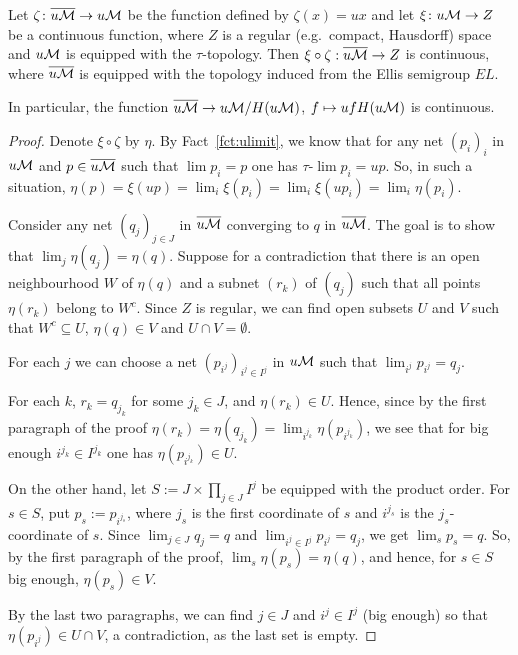	\begin{prop}
		\label{prop:strange_cont}
		Let $\zeta\colon \overline{u{\mathcal M}} \to u{\mathcal M} $ be the function defined by $\zeta(x)=ux$ and let $\xi\colon u{\mathcal M} \to Z$ be a continuous function, where $Z$ is a regular (e.g.\ compact, Hausdorff) space and $u{\mathcal M} $ is equipped with the $\tau$-topology. Then $\xi \circ \zeta:\overline{u{\mathcal M}} \to Z$ is continuous, where $\overline{u{\mathcal M}}$ is equipped with the topology induced from the Ellis semigroup $EL$.
		
		In particular, the function $\overline{u{\mathcal M}}\to u{\mathcal M}/H(u{\mathcal M})$, $f\mapsto ufH(u{\mathcal M})$ is continuous.
	\end{prop}
	\begin{proof}
		Denote $\xi \circ \zeta$ by $\eta$.
		By Fact~\ref{fct:ulimit}, we know that for any net $(p_i)_i$ in $u{\mathcal M} $ and $ p \in \overline{u{\mathcal M}}$ such that $\lim p_i = p$ one has $\tau\mbox{-}\!\lim p_i=up$. So, in such a situation, $\eta(p)=\xi(up)=\lim_i \xi(p_i)=\lim_i \xi(up_i)=\lim_i \eta(p_i)$.
		
		Consider any net $(q_j)_{j\in J}$ in $\overline{u{\mathcal M}}$ converging to $q$ in $\overline{u{\mathcal M}}$. The goal is to show that $\lim_j \eta(q_j)=\eta(q)$. Suppose for a contradiction that there is an open neighbourhood $W$ of $\eta(q)$ and a subnet $(r_k)$ of $(q_j)$ such that all points $\eta(r_k)$ belong to $W^c$. Since $Z$ is regular, we can find open subsets $U$ and $V$ such that $W^c \subseteq U$, $\eta(q) \in V$ and $U \cap V=\emptyset$.
		
		For each $j$ we can choose a net $(p_{i^j})_{i^j \in I^j}$ in $u{\mathcal M} $ such that $\lim_{i^j} p_{i^j}=q_j$.
		
		For each $k$, $r_k = q_{j_{k}}$ for some $j_k \in J$, and $\eta(r_k) \in U$. Hence, since by the first paragraph of the proof $\eta(r_k)=\eta(q_{j_k})= \lim_{i^{j_k}} \eta(p_{i^{j_k}})$, we see that for big enough $i^{j_k} \in I^{j_k}$ one has $\eta(p_{i^{j_k}}) \in U$.
		
		On the other hand, let $S:=J \times \prod_{j \in J} I^j$ be equipped with the product order. For $s \in S$, put $p_s:= p_{i^{j_s}}$, where $j_s$ is the first coordinate of $s$ and $i^{j_s}$ is the $j_s$-coordinate of $s$. Since $\lim_{j \in J} q_j=q$ and $\lim_{i^j \in I^j} p_{i^j}=q_j$, we get $\lim_s p_s=q$. So, by the first paragraph of the proof, $\lim_s \eta(p_s)=\eta(q) $, and hence, for $s\in S$ big enough, $\eta(p_s) \in V$.
		
		By the last two paragraphs, we can find $j \in J$ and $i^j \in I^j$ (big enough) so that $\eta(p_{i^j}) \in U \cap V$, a contradiction, as the last set is empty.
	\end{proof}

